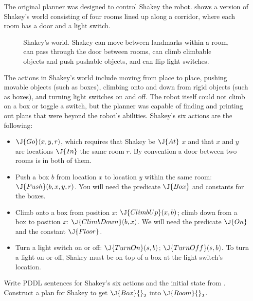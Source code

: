 \begin{exercise}
The original  planner was designed to control 
Shakey the robot.   shows a 
version of Shakey's world consisting of four rooms lined up along a corridor, 
where each room has a door and a light switch.
%
\begin{figure}[tbp]
\caption{Shakey's world. Shakey can move between landmarks within a room, can
pass through the door between rooms, can climb climbable objects and push 
pushable objects, and can flip light switches.}
\label{shakey-figure}
\end{figure}
%
The actions in Shakey's world include moving from place to place,
pushing movable objects (such as boxes), climbing onto and down from rigid
objects (such as boxes), and turning light switches on and
off. The robot itself could not climb on a box or toggle a switch, but the
planner was capable of finding and printing out
plans that were beyond the robot's abilities.  Shakey's six actions 
are the following:
\begin{itemize}
\item \(\J{Go}(x,y,r)\), which requires that Shakey be \(\J{At}\) \(x\) and that \(x\) and
\(y\) are locations \(\J{In}\) the same room \(r\).  By convention a door between two
rooms is in both of them.

\item Push a box \(b\) from location \(x\) to location \(y\) within the same room: \(\J{Push}(b,x,y,r)\).
You will need the predicate \(\J{Box}\) and constants for the boxes.

\item Climb onto a box from position \(x\): \(\J{ClimbUp}(x, b)\); climb down from a box
to position \(x\): \(\J{ClimbDown}(b, x)\).
We will need the predicate \(\J{On}\) and the constant \(\J{Floor}\).

\item Turn a light switch on or off: \(\J{TurnOn}(s,b)\);  \(\J{TurnOff}(s,b)\). 
To turn a light on or off, Shakey must be on top of a box 
at the light switch's location.
\end{itemize}
%
Write PDDL sentences for Shakey's six actions and the initial state from 
. Construct a plan for
Shakey to get \(\J{Box}{}_2\) into \(\J{Room}{}_2\).
\end{exercise} 

